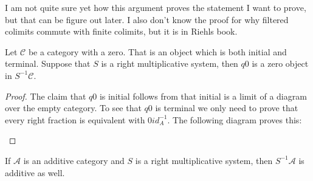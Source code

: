     \begin{remark}
        I am not quite sure yet how this argument proves the statement I want to prove, but that can be figure out later. I also don't know the proof for why filtered colimits commute with finite colimits, but it is in Riehls book.
    \end{remark}

    \begin{prop}
        Let $\mathcal{C}$ be a category with a zero. That is an object which is both initial and terminal. Suppose that $S$ is a right multiplicative system, then $q0$ is a zero object in $S^{-1}\mathcal{C}$.
    \end{prop}

    \begin{proof}
        The claim that $q0$ is initial follows from that initial is a limit of a diagram over the empty category. To see that $q0$ is terminal we only need to prove that every right fraction is equivalent with $0id_A^{-1}$. The following diagram proves this:
        \begin{center}
        \end{center}
    \end{proof}

    \begin{prop}
        If $\mathcal{A}$ is an additive category and $S$ is a right multiplicative system, then $S^{-1}\mathcal{A}$ is additive as well.
    \end{prop}

